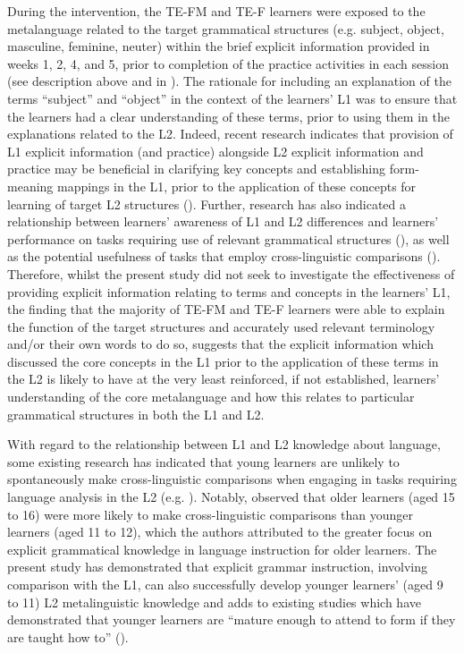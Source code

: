 \documentclass[output=paper]{langscibook}
\begin{document}
During the intervention, the TE-FM and TE-F learners were exposed to the metalanguage related to the target grammatical structures (e.g. subject, object, masculine, feminine, neuter) within the brief explicit information provided in weeks 1, 2, 4, and 5, prior to completion of the practice activities in each session (see description above and in \citealt{Hanan2015}). The rationale for including an explanation of the terms ``subject'' and ``object'' in the context of the learners’ L1 was to ensure that the learners had a clear understanding of these terms, prior to using them in the explanations related to the L2. Indeed, recent research indicates that provision of L1 explicit information (and practice) alongside L2 explicit information and practice may be beneficial in clarifying key concepts and establishing form-meaning mappings in the L1, prior to the application of these concepts for learning of target L2 structures (\citealt{McManusMarsden2017}). Further, research has also indicated a relationship between learners’ awareness of L1 and L2 differences and learners’ performance on tasks requiring use of relevant grammatical structures (\citealt{AmmarEtAl2010,WhiteRanta2002}), as well as the potential usefulness of tasks that employ cross-linguistic comparisons (\citealt{WhiteEtAl2007}). Therefore, whilst the present study did not seek to investigate the effectiveness of providing explicit information relating to terms and concepts in the learners’ L1, the finding that the majority of TE-FM and TE-F learners were able to explain the function of the target structures and accurately used relevant terminology and/or their own words to do so, suggests that the explicit information which discussed the core concepts in the L1 prior to the application of these terms in the L2 is likely to have at the very least reinforced, if not established, learners’ understanding of the core metalanguage and how this relates to particular grammatical structures in both the L1 and L2.

With regard to the relationship between L1 and L2 knowledge about language, some existing research has indicated that young learners are unlikely to spontaneously make cross-linguistic comparisons when engaging in tasks requiring language analysis in the L2 (e.g. \citealt{BellEtAl2020}). Notably, \citet{BellEtAl2020} observed that older learners (aged 15 to 16) were more likely to make cross-linguistic comparisons than younger learners (aged 11 to 12), which the authors attributed to the greater focus on explicit grammatical knowledge in language instruction for older learners. The present study has demonstrated that explicit grammar instruction, involving comparison with the L1, can also successfully develop younger learners’ (aged 9 to 11) L2 metalinguistic knowledge and adds to existing studies which have demonstrated that younger learners are “mature enough to attend to form if they are taught how to” (\citealt[22]{BouffardSarkar2008}).
\end{document}
